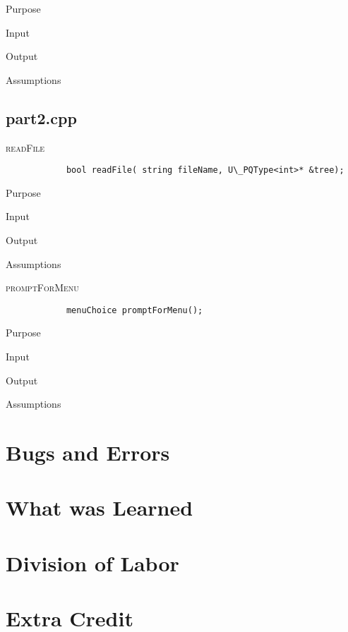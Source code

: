 \documentclass[pdftex, 12pt]{article}
\begin{document}
\begin{description}
\begin{description}
			\item{Purpose}

			\item{Input}

			\item{Output}

			\item{Assumptions}

		\end{description}
\end{description}
\subsection{part2.cpp}
\begin{description}
	\item{\textsc{readFile}}
		\begin{lstlisting}
			bool readFile( string fileName, U\_PQType<int>* &tree);
		\end{lstlisting}
		\begin{description}

			\item{Purpose}

			\item{Input}

			\item{Output}

			\item{Assumptions}

		\end{description}
	\item{\textsc{promptForMenu}}
		\begin{lstlisting}
			menuChoice promptForMenu();
		\end{lstlisting}
		\begin{description}

			\item{Purpose}

			\item{Input}

			\item{Output}

			\item{Assumptions}

		\end{description}

\end{description}
\section{Bugs and Errors}

\section{What was Learned}

\section{Division of Labor}

\section{Extra Credit}
\end{document}
